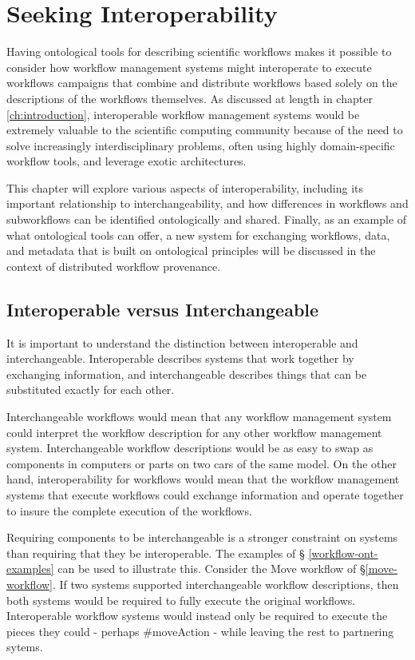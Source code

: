 \chapter{Seeking Interoperability} \label{ch:interoperability}

Having ontological tools for describing scientific workflows makes it possible
to consider how workflow management systems might interoperate to execute
workflows campaigns that combine and distribute workflows based solely on the
descriptions of the workflows themselves. As discussed at length in
chapter \ref{ch:introduction}, interoperable workflow management systems would
be extremely valuable to the scientific computing community because of the need
to solve increasingly interdisciplinary problems, often using highly
domain-specific workflow tools, and leverage exotic architectures.

This chapter will explore various aspects of interoperability, including its
important relationship to interchangeability, and how differences in workflows
and subworkflows can be identified ontologically and shared. Finally, as an
example of what ontological tools can offer, a new system for exchanging
workflows, data, and metadata that is built on ontological principles will be
discussed in the context of distributed workflow provenance.

\section{Interoperable versus Interchangeable}

It is important to understand the distinction between interoperable and
interchangeable. Interoperable describes systems that work together by
exchanging information, and interchangeable describes things that can be
substituted exactly for each other.

Interchangeable workflows would mean that any workflow management system could
interpret the workflow description for any other workflow management system.
Interchangeable workflow descriptions would be as easy to swap as components in
computers or parts on two cars of the same model. On the other hand,
interoperability for workflows would mean that the workflow management systems
that execute workflows could exchange information and operate together to
insure the complete execution of the workflows.

Requiring components to be interchangeable is a stronger constraint on systems
than requiring that they be interoperable. The examples of \S
\ref{workflow-ont-examples} can be used to illustrate this. Consider the Move
workflow of \S \ref{move-workflow}. If two systems supported interchangeable
workflow descriptions, then both systems would be required to fully execute the
original workflows. Interoperable workflow systems would instead only be
required to execute the pieces they could - perhaps \#moveAction - while leaving
the rest to partnering sytems.

